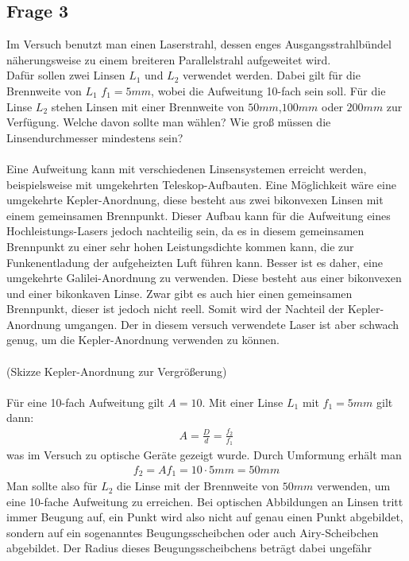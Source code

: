 \documentclass[a4paper,10pt]{scrartcl}
\begin{document}
		\subsection{Frage 3}
			Im Versuch benutzt man einen Laserstrahl, dessen enges Ausgangsstrahlbündel näherungsweise zu einem breiteren Parallelstrahl aufgeweitet wird.\\
			Dafür sollen zwei Linsen \(L_{1}\) und \(L_{2}\) verwendet werden. Dabei gilt für die Brennweite von \(L_{1}\) \(f_{1}=5mm\), wobei die  Aufweitung 10-fach sein soll. Für die Linse \(L_{2}\) stehen Linsen mit einer Brennweite von \(50mm\),\(100mm\) oder \(200mm\) zur Verfügung. Welche davon sollte man wählen? Wie groß müssen die Linsendurchmesser mindestens sein?\\
			\\
			Eine Aufweitung kann mit verschiedenen Linsensystemen erreicht werden, beispielsweise mit umgekehrten Teleskop-Aufbauten. Eine Möglichkeit wäre eine umgekehrte Kepler-Anordnung, diese besteht aus zwei bikonvexen Linsen mit einem gemeinsamen Brennpunkt. Dieser Aufbau kann für die Aufweitung eines Hochleistungs-Lasers jedoch nachteilig sein, da es in diesem gemeinsamen Brennpunkt zu einer sehr hohen Leistungsdichte kommen kann, die zur Funkenentladung der aufgeheizten Luft führen kann. Besser ist es daher, eine umgekehrte Galilei-Anordnung zu verwenden. Diese besteht aus einer bikonvexen und einer bikonkaven Linse. Zwar gibt es auch hier einen gemeinsamen Brennpunkt, dieser ist jedoch nicht reell. 
			Somit wird der Nachteil der Kepler-Anordnung umgangen. Der in diesem versuch verwendete Laser ist aber schwach genug, um die Kepler-Anordnung verwenden zu können.\\
			\\
			(Skizze Kepler-Anordnung zur Vergrößerung)\\
			\\
			Für eine 10-fach Aufweitung gilt \(A=10\). Mit einer Linse \(L_{1}\) mit \(f_{1}=5mm\) gilt dann:
			\begin{align*}
			A=\frac{D}{d}=\frac{f_{2}}{f_{1}}
			\end{align*}
			was im Versuch zu optische Geräte gezeigt wurde. Durch Umformung erhält man
			\begin{align*}
			f_{2}=Af_{1}=10 \cdot 5mm=50mm
			\end{align*}
			Man sollte also für \(L_{2}\) die Linse mit der Brennweite von \(50mm\) verwenden, um eine 10-fache Aufweitung zu erreichen. Bei optischen Abbildungen an Linsen tritt immer Beugung auf, ein Punkt wird also nicht auf genau einen Punkt abgebildet, sondern auf ein sogenanntes Beugungsscheibchen oder auch Airy-Scheibchen abgebildet. Der Radius dieses Beugungsscheibchens beträgt dabei ungefähr
\end{document}
